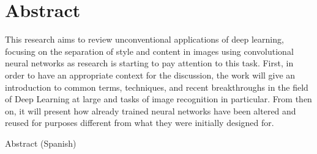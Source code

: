 
\chapter*{Abstract}
\label{sec:abstract}

\vspace*{-10mm}
This research aims to review unconventional applications of deep learning, focusing on the separation of style and content in images using convolutional neural networks as research is starting to pay attention to this task.
First, in order to have an appropriate context for the discussion, the work will give an introduction to common terms, techniques, and recent breakthroughs in the field of Deep Learning at large and tasks of image recognition in particular.
From then on, it will present how already trained neural networks have been altered and reused for purposes different from what they were initially designed for.

\vspace*{20mm}

{Abstract (Spanish)}\label{sec:abstract-diff} \\


